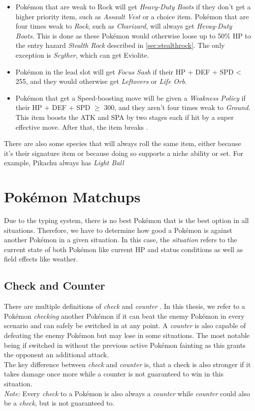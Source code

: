 \begin{itemize}
{	Vest} if their \ac{HP} + \ac{DEF} + \ac{SPD} $\geq$ 235. Otherwise, \textit{Expert Belt},
	\textit{Leftovers} or \textit{Life Orb} is generated.
	\item Pokémon that are weak to Rock will get \textit{Heavy-Duty Boots} if they don't get a 
	higher priority item, such as \textit{Assault Vest} or a choice item. Pokémon that are four
	times weak to \textit{Rock}, such as \textit{Charizard}, will always get \textit{Hevay-Duty Boots}.
	This is done as these Pokémon would otherwise loose up to 50\% \ac{HP} to the entry hazard
	\textit{Stealth Rock} described in \ref{sec:stealthrock}. The only exception is \textit{Scyther},
	which can get Eviolite.
	\item Pokémon in the lead slot will get \textit{Focus Sash} if their \ac{HP} + \ac{DEF} + \ac{SPD} < 255,
	and they would otherwise get \textit{Leftovers} or \textit{Life Orb}.
	\item Pokémon that get a Speed-boosting move will be given a \textit{Weakness Policy} if their \ac{HP}
	+ \ac{DEF} + \ac{SPD} $\geq$ 300, and they aren't four times weak to \textit{Ground}. This item
	boosts the \ac{ATK} and \ac{SPA} by two stages each if hit by a super effective move. After that,
	the item breaks \cite{Bulbapedia:WeaknessPolicy}.
\end{itemize}
There are also some species that will always roll the same item, either because it's their signature item or
because doing so supports a niche ability or set. For example, Pikachu always has \textit{Light Ball}

\section{Pokémon Matchups}
Due to the typing system, there is no best Pokémon that is the best option in all situations. Therefore, we 
have to determine how good a Pokémon is against another Pokémon in a given situation. In this case, the
\textit{situation} refers to the current state of both Pokémon like current \ac{HP} and status conditions
as well as field effects like weather. 
\subsection{Check and Counter}
There are multiple definitions of \textit{check} and \textit{counter} . In
this thesis, we refer to a Pokémon \textit{checking} another Pokémon if it can beat the enemy Pokémon in 
every scenario and can safely be switched in at any point. A \textit{counter} is also capable of defeating
the enemy Pokémon but may lose in some situations. The most notable being if switched in without the
previous active Pokémon fainting as this grants the opponent an additional attack. \\
The key difference between \textit{check} and \textit{counter} is, that a check is also stronger if
it takes damage once more while a counter is not guaranteed to win in this situation. \\
\textit{Note:} Every \textit{check} to a Pokémon is also always a \textit{counter} while \textit{counter}
could also be a \textit{check}, but is not guaranteed to. 

